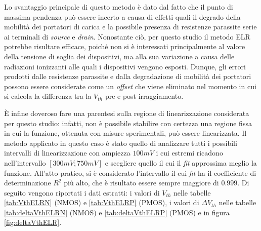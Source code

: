 Lo svantaggio principale di questo metodo è dato dal fatto che il punto di massima pendenza può essere incerto a causa di effetti quali il degrado della mobilità dei portatori di carica e la possibile presenza di resistenze parassite serie ai terminali di \emph{source} e \emph{drain}.
Nonostante ciò, per questo studio il metodo ELR potrebbe risultare efficace, poiché non si è interessati principalmente al valore della tensione di soglia dei dispositivi, ma alla sua variazione a causa delle radiazioni ionizzanti alle quali i dispositivi vengono esposti. Dunque, gli errori prodotti dalle resistenze parassite e dalla degradazione di mobilità dei portatori possono essere considerate come un \textit{offset} che viene eliminato nel momento in cui si calcola la differenza tra la $V_{th}$ pre e post irraggiamento.

È infine doveroso fare una parentesi sulla regione di linearizzazione considerata per questo studio: infatti, non è possibile stabilire con certezza una regione fissa in cui la funzione, ottenuta con misure sperimentali, può essere linearizzata. Il metodo applicato in questo caso è stato quello di analizzare tutti i possibili intervalli di linearizzazione con ampiezza $100 mV$ i cui estremi ricadono nell'intervallo $[300 mV ; 750mV]$ e scegliere quello il cui il \emph{fit} approssima meglio la funzione. All'atto pratico, si è considerato l'intervallo il cui \emph{fit} ha il coefficiente di determinazione $R^2$ più alto, che è risultato essere sempre maggiore di $0.999$. Di seguito vengono riportati i dati estratti: i valori di ${V_{th}}$ nelle tabelle \ref{tab:VthELRN} (NMOS) e \ref{tab:VthELRP} (PMOS), i valori di $\Delta V_{th}$ nelle tabelle \ref{tab:deltaVthELRN} (NMOS) e \ref{tab:deltaVthELRP} (PMOS) e in figura \ref{fig:deltaVthELR}.  

\clearpage

